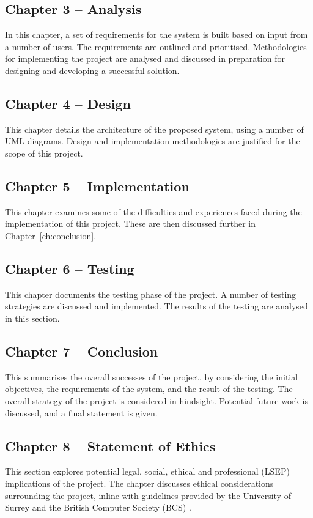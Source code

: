 \subsection*{Chapter 3 -- Analysis}
In this chapter, a set of requirements for the system is built based on input from a number of users. The requirements are outlined and prioritised. Methodologies for implementing the project are analysed and discussed in preparation for designing and developing a successful solution.

\subsection*{Chapter 4 -- Design}
This chapter details the architecture of the proposed system, using a number of UML diagrams. Design and implementation methodologies are justified for the scope of this project.

\subsection*{Chapter 5 -- Implementation}
This chapter examines some of the difficulties and experiences faced during the implementation of this project. These are then discussed further in Chapter~\ref{ch:conclusion}.

\subsection*{Chapter 6 -- Testing}
This chapter documents the testing phase of the project. A number of testing strategies are discussed and implemented. The results of the testing are analysed in this section.

\subsection*{Chapter 7 -- Conclusion}
This summarises the overall successes of the project, by considering the initial objectives, the requirements of the system, and the result of the testing. The overall strategy of the project is considered in hindsight. Potential future work is discussed, and a final statement is given.

\subsection*{Chapter 8 -- Statement of Ethics}
This section explores potential legal, social, ethical and professional (LSEP) implications of the project. The chapter discusses ethical considerations surrounding the project, inline with guidelines provided by the University of Surrey \cite{surreyethics} and the British Computer Society (BCS) \cite{bcs2019conduct}.

